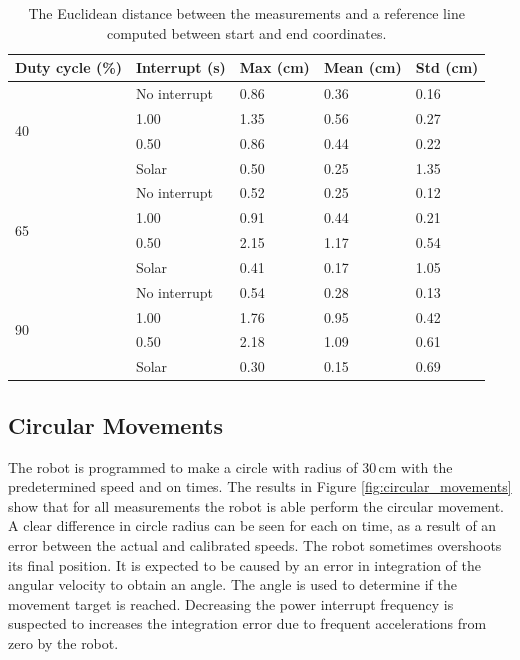\begin{table}[t]
	\centering
	\caption{The Euclidean distance between the measurements and a reference line computed between start and end coordinates.}
	\label{tab:straight_results}
	\begin{tabular}{|l|l||l|l|l|}
		\hline
		Duty cycle (\%) & Interrupt (s) & Max (cm) & Mean (cm) & Std (cm)\\
		\hline \hline
		\multirow{4}{*}{40} & No interrupt & 0.86 & 0.36 & 0.16 \\
		& 1.00 & 1.35 & 0.56 & 0.27 \\
		& 0.50 & 0.86 & 0.44 & 0.22 \\
		& Solar & 0.50 & 0.25 & 1.35 \\
		\hline
		\multirow{4}{*}{65} & No interrupt & 0.52 & 0.25 & 0.12 \\
		& 1.00 & 0.91 & 0.44 & 0.21 \\
		& 0.50 & 2.15 & 1.17 & 0.54 \\
		& Solar & 0.41 & 0.17 & 1.05 \\
		\hline
		\multirow{4}{*}{90} & No interrupt & 0.54 & 0.28 & 0.13 \\
		& 1.00 & 1.76 & 0.95 & 0.42 \\
		& 0.50 & 2.18 & 1.09 & 0.61 \\
		& Solar & 0.30 & 0.15 & 0.69 \\
		\hline
	\end{tabular}
\end{table}

\subsection{Circular Movements}

The robot is programmed to make a circle with radius of 30\,cm with the predetermined speed and on times.
The results in Figure \ref{fig:circular_movements} show that for all measurements the robot is able perform the circular movement.
A clear difference in circle radius can be seen for each on time, as a result of an error between the actual and calibrated speeds.
The robot sometimes overshoots its final position.
It is expected to be caused by an error in integration of the angular velocity to obtain an angle.
The angle is used to determine if the movement target is reached.
Decreasing the power interrupt frequency is suspected to increases the integration error due to frequent accelerations from zero by the robot.

